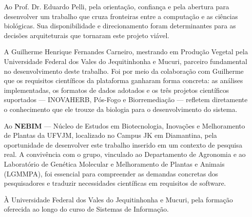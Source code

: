\documentclass[12pt,a4paper,oneside,sumario=abnt-6027-2012,chapter=TITLE]{UFVJM-abntex2}
\begin{document}
\begin{agradecimentos}

Ao Prof. Dr. Eduardo Pelli, pela orientação, confiança e pela abertura para
desenvolver um trabalho que cruza fronteiras entre a computação e as ciências
biológicas. Sua disponibilidade e direcionamento foram determinantes para as
decisões arquiteturais que tornaram este projeto viável.

A Guilherme Henrique Fernandes Carneiro, mestrando em Produção Vegetal pela
Universidade Federal dos Vales do Jequitinhonha e Mucuri, parceiro fundamental
no desenvolvimento deste trabalho. Foi por meio da colaboração com Guilherme
que os requisitos científicos da plataforma ganharam forma concreta: as
análises implementadas, os formatos de dados adotados e os três projetos
científicos suportados --- INOVAHERB, Pós-Fogo e Biorremediação --- refletem
diretamente o conhecimento que ele trouxe da biologia para o desenvolvimento
do sistema.

Ao \textbf{NEBIM} --- Núcleo de Estudos em Biotecnologia, Inovações e
Melhoramento de Plantas da UFVJM, localizado no Campus JK em Diamantina,
pela oportunidade de desenvolver este trabalho inserido em um contexto de
pesquisa real. A convivência com o grupo, vinculado ao Departamento de
Agronomia e ao Laboratório de Genética Molecular e Melhoramento de Plantas
e Animais (LGMMPA), foi essencial para compreender as demandas concretas dos
pesquisadores e traduzir necessidades científicas em requisitos de software.

À Universidade Federal dos Vales do Jequitinhonha e Mucuri, pela formação
oferecida ao longo do curso de Sistemas de Informação.

\end{agradecimentos}


\cleardoublepage


\cleardoublepage

\listoffigures*
\cleardoublepage

\listoftables*
\cleardoublepage
\end{document}
